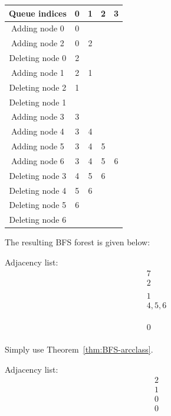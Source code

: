 \begin{center}
\begin{tabular}{|c|c|c|c|c|}
\hline
Queue indices& 0& 1& 2& 3 \\
\hline
Adding node 0& 0& & & \\
\hline
Adding node 2& 0& 2& & \\
\hline
Deleting node 0& 2& & & \\
\hline
Adding node 1& 2& 1& & \\
\hline
Deleting node 2& 1& & & \\
\hline
Deleting node 1& & & & \\
\hline
Adding node 3& 3& & & \\
\hline
Adding node 4& 3& 4& & \\
\hline
Adding node 5& 3& 4& 5& \\
\hline
Adding node 6& 3& 4& 5& 6 \\
\hline
Deleting node 3& 4& 5& 6 & \\
\hline
Deleting node 4& 5& 6 & & \\
\hline
Deleting node 5& 6 & & & \\
\hline
Deleting node 6& & & & \\
\hline
\end{tabular}
\end{center}

The resulting BFS forest is given below:

Adjacency list:
\begin{align*}
&7 \\
&2 \\
& \\
&1 \\
&4,5,6 \\
& \\
& \\
& \\
&0 \\
\end{align*}

Simply use Theorem~\ref{thm:BFS-arcclass}.


Adjacency list:
\begin{align*}
&2 \\
&1 \\
&0 \\
&0 \\
\end{align*}
\fi


